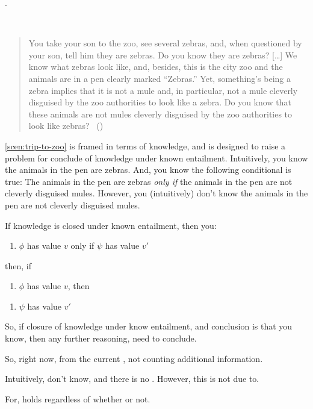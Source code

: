 \begin{note}
  \citeauthor{Dretske:1970to}.
  \begin{scenario}\mbox{ }
    \label{scen:trip-to-zoo}
    \vspace{-\baselineskip}
    \begin{quote}
      You take your son to the zoo, see several zebras, and, when questioned by your son, tell him they are zebras.
      Do you know they are zebras?
      [\dots]
      We know what zebras look like, and, besides, this is the city zoo and the animals are in a pen clearly marked ``Zebras.''
      Yet, something's being a zebra implies that it is not a mule and, in particular, not a mule cleverly disguised by the zoo authorities to look like a zebra.
      Do you know that these animals are not mules cleverly disguised by the zoo authorities to look like zebras?\newline
      \mbox{ }\hfill\mbox{(\citeyear[1015--1016]{Dretske:1970to})}
    \end{quote}
    \vspace{-\baselineskip}
  \end{scenario}

  \autoref{scen:trip-to-zoo} is framed in terms of knowledge, and is designed to raise a problem for conclude of knowledge under known entailment.
  Intuitively, you know the animals in the pen are zebras.
  And, you know the following conditional is true:
  The animals in the pen are zebras \emph{only if} the animals in the pen are not cleverly disguised mules.
  However, you (intuitively) don't know the animals in the pen are not cleverly disguised mules.

  If knowledge is closed under known entailment, then you:

  \begin{enumerate}
  \item
    \(\phi\) has value \(v\) only if \(\psi\) has value \(v'\)
  \end{enumerate}

  then, if

  \begin{enumerate}
  \item
    \(\phi\) has value \(v\), then
  \end{enumerate}

  \begin{enumerate}
  \item
    \(\psi\) has value \(v'\)
  \end{enumerate}

  So, if closure of knowledge under know entailment, and conclusion is that you know, then any further reasoning, need to conclude.

  So, right now, from the current \poP{}, not counting additional information.

  Intuitively, don't know, and there is no \pevent{}.
  However, this is not due to.

  For, holds regardless of whether or not.
\end{note}

